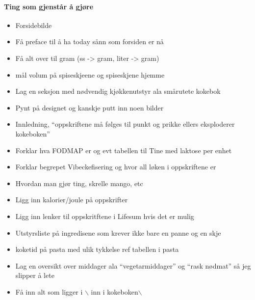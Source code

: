 
\paragraph{Ting som gjenstår å gjøre}
\begin{itemize}[noitemsep]
  \item Forsidebilde
  \item Få preface til å ha today sånn som forsiden er nå
  \item Få alt over til gram (ss -> gram, liter -> gram)
  \item mål volum på spiseskjeene og spiseskjene hjemme
  \item Lag en seksjon med nødvendig kjøkkenutstyr ala smårutete kokebok
  \item Pynt på designet og kanskje putt inn noen bilder
  \item Innledning, ``oppskriftene må følges til punkt og prikke ellers eksploderer kokeboken''
  \item Forklar hva FODMAP er og evt tabellen til Tine med laktose per enhet
  \item Forklar begrepet Vibeckefisering og hvor all løken i oppskriftene er
  \item Hvordan man gjør ting, skrelle mango, etc
  \item Ligg inn kalorier/joule på oppskrifter
  \item Ligg inn lenker til oppskritftene i Lifesum hvis det er mulig
  \item Utstyrsliste på ingredisene som krever ikke bare en panne og en skje
  \item koketid på pasta med ulik tykkelse ref tabellen i pasta
  \item Lag en oversikt over middager ala ``vegetarmiddager'' og ``rask nødmat'' så jeg slipper å lete
  \item Få inn alt som ligger i  $\backslash{}$ inn i kokeboken$\backslash{}$
\end{itemize}
